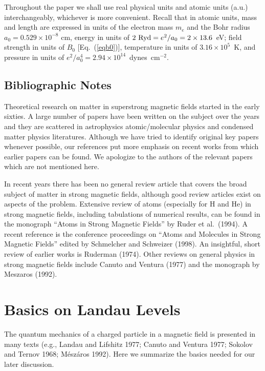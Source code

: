 Throughout the paper we shall use real physical units and 
atomic units (a.u.) interchangeably, whichever is more convenient. 
Recall that in atomic units, mass and length are expressed in units 
of the electron mass $m_e$ and the Bohr radius 
$a_0=0.529\times 10^{-8}$ cm, energy in units of 
$2~{\rm Ryd}=e^2/a_0=2\times 13.6$~eV; field strength 
in units of $B_0$ [Eq.~(\ref{eqb0})], temperature in units of 
$3.16\times 10^5$~K, and pressure in units of $e^2/a_0^4=
2.94\times 10^{14}$~dynes~cm$^{-2}$.

\subsection{Bibliographic Notes}

Theoretical research on matter in superstrong magnetic fields started
in the early sixties. A large number of papers have been written 
on the subject over the years and they are scattered in astrophysics
atomic/molecular physics and condensed matter physics literatures. 
Although we have tried to identify original key papers whenever possible, 
our references put more emphasis on recent works from which earlier 
papers can be found. We apologize to the authors of the relevant papers
which are not mentioned here.

In recent years there has been no general review article
that covers the broad subject of matter in strong magnetic fields,
although good review articles exist on aspects of the problem.
Extensive review of atoms (especially for H and He)
in strong magnetic fields, including tabulations of numerical results,
can be found in the monograph ``Atoms in Strong Magnetic Fields'' by Ruder et
al.~(1994). A recent reference is the conference proceedings on 
``Atoms and Molecules in Strong Magnetic Fields'' edited by 
Schmelcher and Schweizer (1998). An insightful, short review of earlier 
works is Ruderman (1974). Other reviews on general physics in strong magnetic
fields include Canuto and Ventura (1977) and the monograph by Meszaros (1992). 


\section{Basics on Landau Levels}
\label{CBI}

The quantum mechanics of a charged particle in a magnetic field
is presented in many texts (e.g., Landau and Lifshitz 1977; 
Canuto and Ventura 1977; Sokolov and Ternov 1968; M\'esz\'aros 1992). Here we
summarize the basics needed for our later discussion. 


